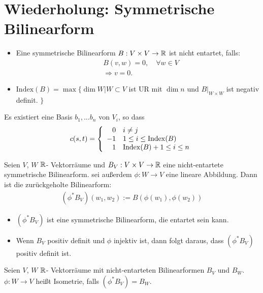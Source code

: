 \section{Wiederholung: Symmetrische Bilinearform}
\begin{defs}
\begin{itemize}
\item Eine symmetrische Bilinearform $B: V \times V \to \mathbb{R}$ ist nicht entartet, falls:
\begin{align}
&B(v, w) = 0, \quad \forall w \in V\\
&\Rightarrow v = 0.
\end{align}
\item $\mathrm{Index}(B) = \max \{ \dim W \vert W \subset V $ ist UR mit $\dim n$ und $B\vert_{W \times W}$ ist negativ definit. $\}$
\end{itemize}
\end{defs}
Es existiert eine Basis ${b_1, \dots b_n}$ von $V_i$, so dass
\begin{align}
c(s, t) = \left\{
\begin{array}{ll}
\hphantom{-} 0 & i \neq j \\
-1 & 1\leq i \leq \mathrm{Index}(B)\\
\hphantom{-} 1 & \mathrm{Index}(B) + 1 \leq i \leq n\\
\end{array}
\right. 
\end{align}
\begin{defs}
Seien $V$, $W$ $\mathbb{R}$- Vektorräume und $B_V : V \times V \to \mathbb{R}$ eine nicht-entartete symmetrische Bilinearform.
sei außerdem $\phi : W \to V$ eine lineare Abbildung.
Dann ist die zurückgeholte Bilinearform:
\begin{align}
(\phi^\ast B_V) (w_1, w_2) := B(\phi(w_1), \phi(w_2))
\end{align}
\end{defs}
\begin{bem}\leavevmode
\begin{itemize}
\item $(\phi^\ast B_V)$ ist eine symmetrische Bilinearform, die entartet sein kann.
\item Wenn $B_V$ positiv definit und $\phi$ injektiv ist, dann folgt daraus, dass $(\phi^\ast B_V)$ positiv definit ist.
\end{itemize}
\end{bem}

\begin{defs}[Isometrie]
Seien $V$, $W$ $\mathbb{R}$- Vektorräume mit nicht-entarteten Bilinearformen $B_V$ und $B_W$.
$\phi: W \to V$ heißt Isometrie, falls $(\phi^\ast B_V) = B_W$.
\end{defs}

